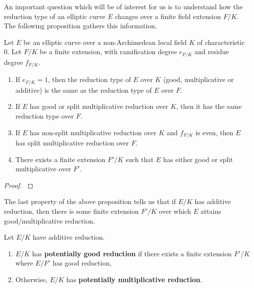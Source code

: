 An important question which will be of interest for us is to understand how the reduction type of an elliptic curve $E$ changes over a finite field extension $F/K$. The following proposition gathers this information.

\begin{prop}
    Let $E$ be an elliptic curve over a non-Archimedean local field $K$ of characteristic $0$. Let $F / K$ be a finite extension, with ramification degree $e_{F / K}$ and residue degree $f_{F / K}$.
    \begin{enumerate}[label={(\roman*)}]
        \setlength\itemsep{0em}
         \item If $e_{F / K} = 1$, then the reduction type of $E$ over $K$ (good, multiplicative or additive) is the same as the reduction type of $E$ over $F$. 
         \item If $E$ has good or split multiplicative reduction over $K$, then it has the same reduction type over $F$.
        \item If $E$ has non-split multiplicative reduction over $K$ and $f_{F / K}$ is even, then $E$ has split multiplicative reduction over $F$. 
        \item There exists a finite extension $F'/K$ such that $E$ has either good or split multiplicative over $F'$.
    \end{enumerate}
\end{prop}
\begin{proof}
    \cite[\S VII Proposition 5.4]{S1} 
\end{proof}

The last property of the above proposition tells us that if $E / K$ has additive reduction, then there is some finite extension $F' / K$ over which $E$ attains good/multiplicative reduction. 

\begin{defn}
    Let $E / K$ have additive reduction. 
    \begin{enumerate}
        \setlength\itemsep{0em}
        \item $E / K$ has \textbf{potentially good reduction} if there exists a finite extension $F ' / K$ where $E / F'$ has good reduction,
        \item Otherwise, $E / K$ has \textbf{potentially multiplicative reduction}.
    \end{enumerate}
\end{defn}


